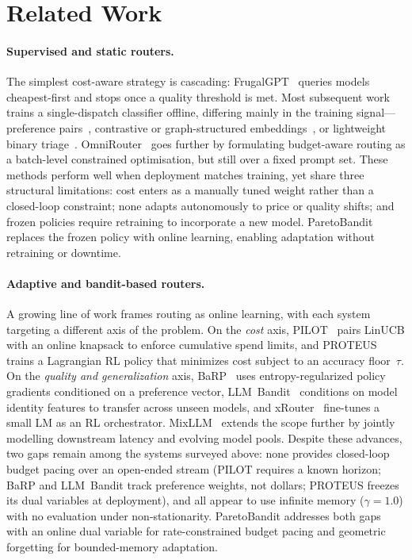 \section{Related Work}
\label{sec:related}

\begingroup
\setlength{\parskip}{2pt}

\paragraph{Supervised and static routers.}
The simplest cost-aware strategy is cascading: FrugalGPT~\cite{chen2023frugalgpt} queries models cheapest-first and stops once a quality threshold is met. Most subsequent work trains a single-dispatch classifier offline, differing mainly in the training signal---preference pairs~\cite{ong2024routellm}, contrastive or graph-structured embeddings~\cite{chen2024routerdc, shirkavand2025cscr, feng2025graphrouter}, or lightweight binary triage~\cite{ding2024hybridllm, pulishetty2025onehead}. OmniRouter~\cite{ma2025omnirouter} goes further by formulating budget-aware routing as a batch-level constrained optimisation, but still over a fixed prompt set.
These methods perform well when deployment matches training, yet share three structural limitations: cost enters as a manually tuned weight rather than a closed-loop constraint; none adapts autonomously to price or quality shifts; and frozen policies require retraining to incorporate a new model.
ParetoBandit replaces the frozen policy with online learning, enabling adaptation without retraining or downtime.

\vspace{-4pt}
\paragraph{Adaptive and bandit-based routers.}
A growing line of work frames routing as online learning, with each system targeting a different axis of the problem.
On the \emph{cost} axis, PILOT~\cite{panda2025pilot} pairs LinUCB with an online knapsack to enforce cumulative spend limits, and PROTEUS~\cite{bhatti2026proteus} trains a Lagrangian RL policy that minimizes cost subject to an accuracy floor~$\tau$.
On the \emph{quality and generalization} axis, BaRP~\cite{wang2025barp} uses entropy-regularized policy gradients conditioned on a preference vector, LLM~Bandit~\cite{li2025llmbandit} conditions on model identity features to transfer across unseen models, and xRouter~\cite{qian2025xrouter} fine-tunes a small LM as an RL orchestrator.
MixLLM~\cite{wang2025mixllm} extends the scope further by jointly modelling downstream latency and evolving model pools.
Despite these advances, two gaps remain among the systems surveyed above: none provides closed-loop budget pacing over an open-ended stream (PILOT requires a known horizon; BaRP and LLM~Bandit track preference weights, not dollars; PROTEUS freezes its dual variables at deployment), and all appear to use infinite memory ($\gamma{=}1.0$) with no evaluation under non-stationarity.
ParetoBandit addresses both gaps with an online dual variable for rate-constrained budget pacing and geometric forgetting for bounded-memory adaptation.

